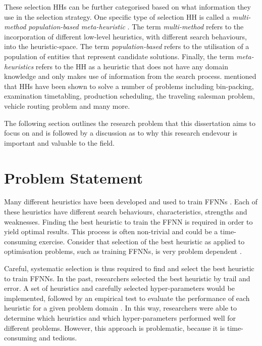 These selection \acp{HH} can be further categorised based on what information
they use in the selection strategy. One specific type of selection \ac{HH} is
called a \textit{multi-method
      population-based meta-heuristic}
\cite{ref:vanderstockt:2018}. The term \textit{multi-method}
refers to the incorporation of different low-level heuristics, with different
search behaviours, into the heuristic-space. The term \textit{population-based}
refers to the utilisation of a population of entities that represent candidate
solutions. Finally, the term \textit{meta-heuristics}
refers to the \ac{HH} as a heuristic that does not have any domain knowledge and
only makes use of information from the search process.
\citeauthor{ref:grobler:2015} \cite{ref:grobler:2015} mentioned that \acp{HH}
have been shown to solve a number of problems including bin-packing, examination
timetabling, production scheduling, the traveling salesman problem, vehicle
routing problem and many more.

The following section outlines the research problem that this dissertation aims to focus on and is followed by a discussion as to why this research endevour is important and valuable to the field.


\section{Problem Statement}
\label{sec:introduction:problem}

Many different heuristics have been developed and used to train \acp{FFNN}
\cite{ref:gudise:2003, ref:rakitianskaia:2012, ref:montana:1989}. Each of these heuristics have different search behaviours, characteristics, strengths and weaknesses. Finding the best heuristic to train the \ac{FFNN} is required in order to yield optimal results. This
process is often non-trivial and could be a time-consuming exercise.  Consider
that selection of the best heuristic as applied to optimisation problems, such
as training \acp{FFNN}, is very problem dependent \cite{ref:allen:1996,
      ref:drake:2020, ref:pillay:2018}.

Careful, systematic selection is thus required to find and select the best
heuristic to train \acp{FFNN}. In the past, researchers selected the best
heuristic by trail and error. A set of heuristics and carefully selected
hyper-parameters would be implemented, followed by an empirical test to evaluate
the performance of each heuristic for a given problem domain
\cite{ref:pillay:2015}. In this way, researchers were able to determine which
heuristics and which hyper-parameters performed well for different problems.
However, this approach is problematic, because it is time-consuming and tedious.


